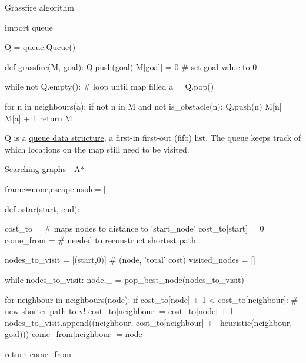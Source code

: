 \documentclass[compress]{beamer}
\begin{document}
\begin{frame}[fragile]{Grassfire algorithm}

\begin{pythoncode}
import queue

Q = queue.Queue()

def grassfire(M, goal):
    Q.push(goal)
    M[goal] = 0 # set goal value to 0

    while not Q.empty(): # loop until map filled
        a = Q.pop()

        for n in neighbours(a):
            if not n in M and not is_obstacle(n):
                Q.push(n)
                M[n] = M[a] + 1
    return M
\end{pythoncode}

Q is a \href{http://en.wikipedia.org/wiki/Queue_(abstract_data_type)}{queue
data structure}, a first-in first-out (fifo) list. The queue keeps track of
which locations on the map still need to be visited.

\end{frame}


\begin{frame}[fragile]{Searching graphs - A*}

\begin{pythoncode*}{frame=none,escapeinside=||}

def astar(start, end):

  cost_to = {} # maps nodes to distance to 'start_node'
  cost_to[start] = 0
  come_from = {} # needed to reconstruct shortest path

  nodes_to_visit = [(start,0)] # (node, 'total' cost)
  visited_nodes = []

  while nodes_to_visit:
    node,_ = pop_best_node(nodes_to_visit)

    for neighbour in neighbours(node):
      if cost_to[node] + 1  < cost_to[neighbour]: # new shorter path to v!
        cost_to[neighbour] = cost_to[node] + 1
        nodes_to_visit.append((neighbour, cost_to[neighbour] + \
                                  heuristic(neighbour, goal)))
        come_from[neighbour] = node

  return come_from
\end{pythoncode*}
\end{frame}

\end{document}
